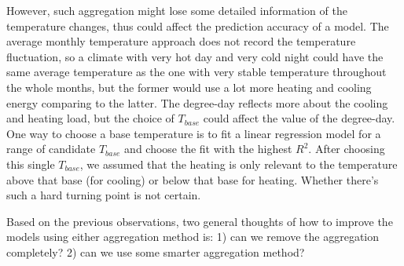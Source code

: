 \documentclass[12pt]{article}
\begin{document}
However, such aggregation might lose some detailed information of the
temperature changes, thus could affect the prediction accuracy of a
model. The average monthly temperature approach does not record the
temperature fluctuation, so a climate with very hot day and very cold
night could have the same average temperature as the one with very
stable temperature throughout the whole months, but the former would
use a lot more heating and cooling energy comparing to the latter. The
degree-day reflects more about the cooling and heating load, but the
choice of $T_{base}$ could affect the value of the degree-day. One way
to choose a base temperature is to fit a linear regression model for a
range of candidate $T_{base}$ and choose the fit with the highest
$R^2$. After choosing this single $T_{base}$, we assumed that the
heating is only relevant to the temperature above that base (for
cooling) or below that base for heating. Whether there's such a hard
turning point is not certain.

Based on the previous observations, two general thoughts of how to
improve the models using either aggregation method is: 1) can we
remove the aggregation completely? 2) can we use some smarter
aggregation method?
\end{document}

